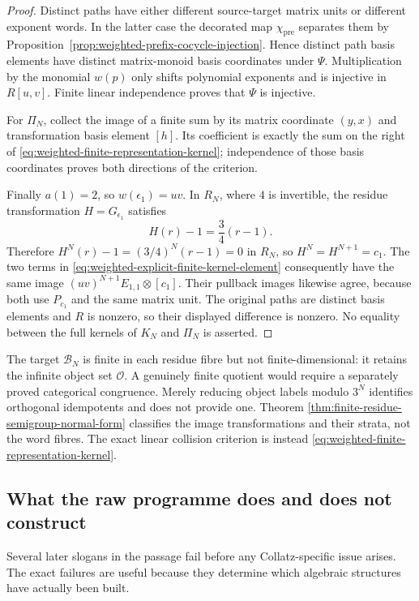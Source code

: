 \begin{proof}
Distinct paths have either different source-target matrix units or different
exponent words.  In the latter case the decorated map
$\chi_{\mathrm{pre}}$ separates them by
Proposition~\ref{prop:weighted-prefix-cocycle-injection}.  Hence distinct path
basis elements have distinct matrix-monoid basis coordinates under $\Psi$.
Multiplication by the monomial $w(p)$ only shifts polynomial exponents and is
injective in $R[u,v]$.  Finite linear independence proves that $\Psi$ is
injective.

For $\Pi_N$, collect the image of a finite sum by its matrix coordinate
$(y,x)$ and transformation basis element $[h]$.  Its coefficient is exactly
the sum on the right of
\eqref{eq:weighted-finite-representation-kernel}; independence of those basis
coordinates proves both directions of the criterion.

Finally $a(1)=2$, so $w(\epsilon_1)=uv$.  In $R_N$, where $4$ is invertible,
the residue transformation $H=G_{\epsilon_1}$ satisfies
\[
 H(r)-1=\frac34(r-1).
\]
Therefore $H^N(r)-1=(3/4)^N(r-1)=0$ in $R_N$, so
$H^N=H^{N+1}=c_1$.  The two terms in
\eqref{eq:weighted-explicit-finite-kernel-element} consequently have the same
image $(uv)^{N+1}E_{1,1}\otimes[c_1]$.  Their pullback images likewise agree,
because both use $P_{c_1}$ and the same matrix unit.  The original paths are
distinct basis elements and $R$ is nonzero, so their displayed difference is
nonzero.  No equality between the full kernels of $K_N$ and $\Pi_N$ is
asserted.
\end{proof}

The target $\mathcal B_N$ is finite in each residue fibre but not
finite-dimensional: it retains the infinite object set $\mathcal O$.  A
genuinely finite quotient would require a separately proved categorical
congruence.  Merely reducing object labels modulo $3^N$ identifies orthogonal
 idempotents and does not provide one.  Theorem
\ref{thm:finite-residue-semigroup-normal-form} classifies the image
transformations and their strata, not the word fibres.  The exact linear
collision criterion is instead
\eqref{eq:weighted-finite-representation-kernel}.

\subsection{What the raw programme does and does not construct}

Several later slogans in the passage fail before any Collatz-specific issue
arises.  The exact failures are useful because they determine which algebraic
structures have actually been built.

